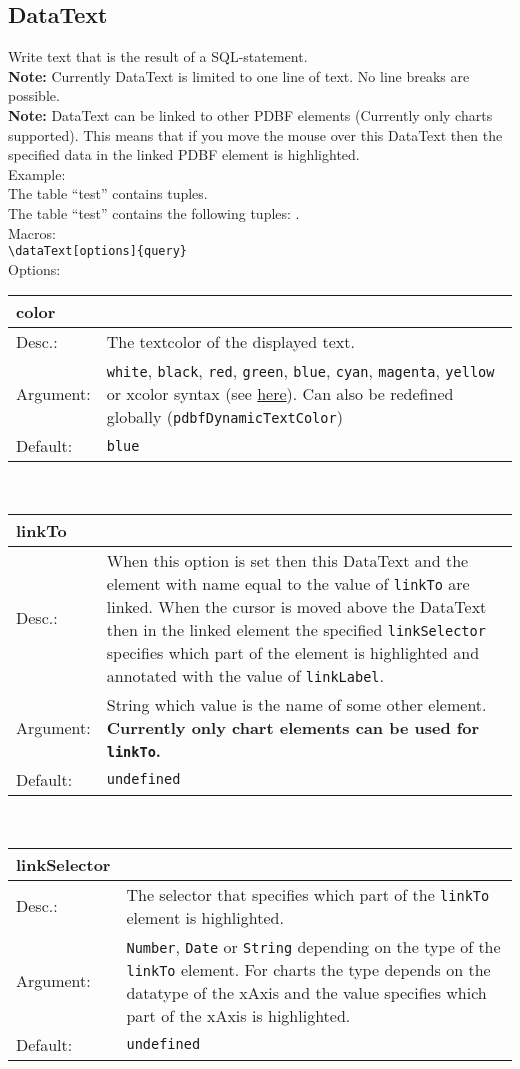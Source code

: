 \documentclass[11pt]{article}
\def\a{5cm}
\def\b{10.5cm}
\def\option#1#2#3#4{%
\noindent \begin{tabular}{|p{\a}|p{\b}|}
\hline
\textbf{#1} & \\
\hline
Desc.: & #2 \\
\hline
Argument: & #3\\
\hline
Default:& #4\\
\hline
\end{tabular} \\[4pt]%
}
\begin{document}
\subsection{DataText}
Write text that is the result of a SQL-statement.\\
\textbf{Note:} Currently DataText is limited to one line of text. No line breaks are possible.\\
\textbf{Note:} DataText can be linked to other PDBF elements (Currently only charts supported). This means that if you move the mouse over this DataText then the specified data in the linked PDBF element is highlighted.\\[3pt]
Example:\\[3pt]
The table ``test'' contains  tuples.\\
The table ``test'' contains the following tuples: .\\[3pt]
%
\noindent Macros: \\[3pt]
\verb|\dataText[options]{query}| \\[8pt]

\noindent Options: \\[3pt]

\option
{color}
{The textcolor of the displayed text.}
{\texttt{white}, \texttt{black}, \texttt{red}, \texttt{green}, \texttt{blue}, \texttt{cyan}, \texttt{magenta}, \texttt{yellow} or xcolor syntax (see \href{http://mirror.unicorncloud.org/CTAN/macros/latex/contrib/xcolor/xcolor.pdf}{here}). Can also be redefined globally (\texttt{pdbfDynamicTextColor})}
{\texttt{blue}}

\option
{linkTo}
{When this option is set then this DataText and the element with name equal to the value of \texttt{linkTo} are linked. When the cursor is moved above the DataText then in the linked element the specified \texttt{linkSelector} specifies which part of the element is highlighted and annotated with the value of \texttt{linkLabel}.}
{String which value is the name of some other element. \textbf{Currently only chart elements can be used for \texttt{linkTo}.}}
{\texttt{undefined}}

\option
{linkSelector}
{The selector that specifies which part of the \texttt{linkTo} element is highlighted.}
{\texttt{Number}, \texttt{Date} or \texttt{String} depending on the type of the \texttt{linkTo} element. For charts the type depends on the datatype of the xAxis and the value specifies which part of the xAxis is highlighted.}
{\texttt{undefined}}
\end{document}
